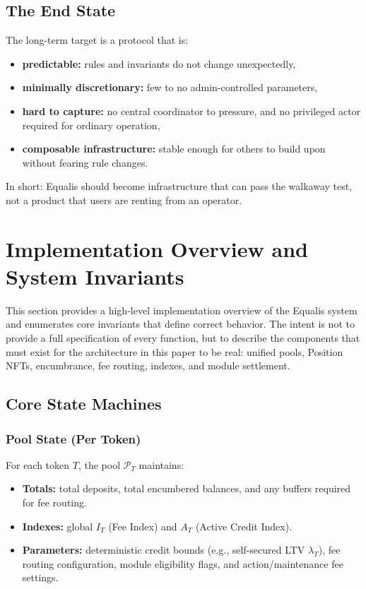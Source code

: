 \documentclass[version=preprint]{iacrcc}
\begin{document}
\subsection{The End State}

The long-term target is a protocol that is:
\begin{itemize}
  \item \textbf{predictable:} rules and invariants do not change unexpectedly,
  \item \textbf{minimally discretionary:} few to no admin-controlled parameters,
  \item \textbf{hard to capture:} no central coordinator to pressure, and no privileged actor required for ordinary operation,
  \item \textbf{composable infrastructure:} stable enough for others to build upon without fearing rule changes.
\end{itemize}

In short: Equalis should become infrastructure that can pass the walkaway test, not a product that users are renting from an operator.

\section{Implementation Overview and System Invariants}

This section provides a high-level implementation overview of the Equalis system and enumerates core invariants that define correct behavior. The intent is not to provide a full specification of every function, but to describe the components that must exist for the architecture in this paper to be real: unified pools, Position NFTs, encumbrance, fee routing, indexes, and module settlement.

\subsection{Core State Machines}

\subsubsection{Pool State (Per Token)}

For each token $T$, the pool $\mathcal{P}_T$ maintains:
\begin{itemize}
  \item \textbf{Totals:} total deposits, total encumbered balances, and any buffers required for fee routing.
  \item \textbf{Indexes:} global $I_T$ (Fee Index) and $A_T$ (Active Credit Index).
  \item \textbf{Parameters:} deterministic credit bounds (e.g., self-secured LTV $\lambda_T$), fee routing configuration, module eligibility flags, and action/maintenance fee settings.
\end{itemize}
\end{document}
